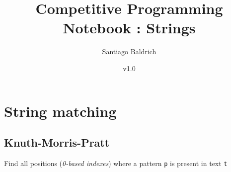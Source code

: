 \documentclass[11pt, oneside]{article}   	%
\title{Competitive Programming Notebook : Strings}
\author{Santiago Baldrich}
\date{v1.0}
\begin{document}
\tableofcontents
\newpage


\section{String matching}
\subsection{Knuth-Morris-Pratt}
Find all positions (\textit{0-based indexes}) where a pattern \verb|p| is present in text \verb|t|
\end{document}
